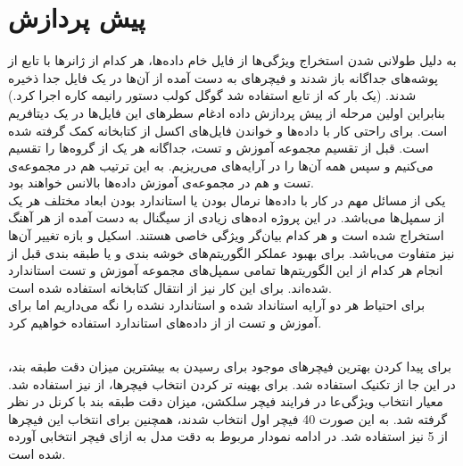 \section{پیش پردازش}
به دلیل طولانی شدن استخراج ویژگی‌ها از فایل خام داده‌ها، هر کدام از ژانرها با تابع  از پوشه‌های جداگانه باز شدند و فیچرهای به دست آمده از آن‌ها در یک فایل  جدا ذخیره شدند. (یک بار که از تابع  استفاده شد گوگل کولب دستور رانیمه کاره اجرا کرد.) بنابراین اولین مرحله از پیش پردازش داده ادغام سطرهای این فایل‌ها در یک دیتافریم است. برای راحتی کار با داده‌ها و خواندن فایل‌های اکسل از کتابخانه  کمک گرفته شده است. قبل از تقسیم مجموعه آموزش و تست، جداگانه هر یک از گروه‌ها را تقسیم می‌کنیم و سپس همه آن‌ها را در آرایه‌های  می‌ریزیم. به این ترتیب هم در مجموعه‌ی تست و هم در مجموعه‌ی آموزش داده‌ها بالانس خواهند بود.
\\
یکی از مسائل مهم در کار با داده‌ها نرمال بودن یا استاندارد بودن ابعاد مختلف هر یک از سمپل‌ها می‌باشد. در این پروژه اده‌های زیادی از سیگنال به دست آمده از هر آهنگ استخراج شده است و هر کدام بیان‌گر ویژگی خاصی هستند. اسکیل و بازه تغییر آن‌ها نیز متفاوت می‌باشد. برای بهبود عملکر الگوریتم‌های خوشه بندی و یا طبقه بندی قبل از انجام هر کدام از این الگوریتم‌ها تمامی سمپل‌های مجموعه آموزش و تست استاندارد شده‌اند. برای این کار نیز از انتقال  کتابخانه  استفاده شده است.
\\
برای احتیاط هر دو آرایه استانداد شده و استاندارد نشده را نگه می‌داریم اما برای آموزش و تست از از داده‌های استاندارد استفاده خواهیم کرد.




\subsection{}
برای پیدا کردن بهترین فیچرهای موجود برای رسیدن به بیشترین میزان دقت طبقه بند، در این جا از تکنیک  استفاده شد.
برای بهینه تر کردن انتخاب فیچرها، از  نیز استفاده شد.
معیار انتخاب ویژگی‌عا در فرایند فیچر سلکشن، میزان دقت طبقه بند  با کرنل  در نظر گرفته شد. 
به این صورت 40 فیچر اول انتخاب شدند، همچنین برای انتخاب این فیچرها از 5  نیز استفاده شد.
در ادامه نمودار مربوط به دقت مدل به ازای فیچر انتخابی آورده شده است.

